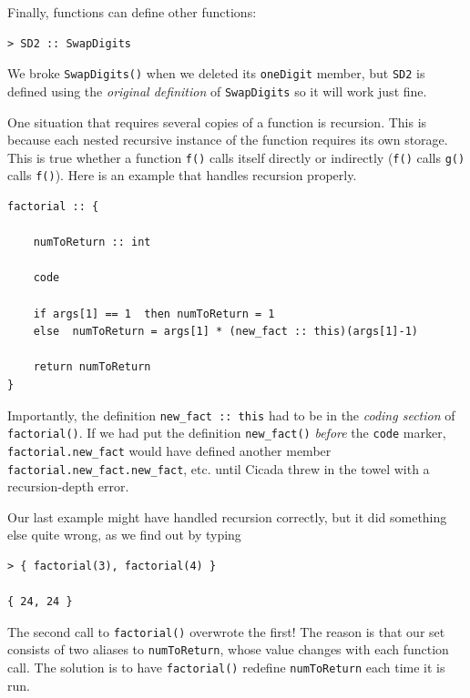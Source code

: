 \documentclass{article}
\newenvironment{code}{
       \begin{list}{}{
               \setlength{\leftmargin}{.4in}
               \setlength{\rightmargin}{0in}
               \setlength{\topsep}{.2in}
       }
       \small
       \item[] }
       { \end{list}   }
\begin{document}
Finally, functions can define other functions:

\begin{code} \begin{verbatim}
> SD2 :: SwapDigits
\end{verbatim} \end{code}

\noindent We broke \verb#SwapDigits()# when we deleted its \verb#oneDigit# member, but \verb#SD2# is defined using the \emph{original definition} of \verb#SwapDigits# so it will work just fine.

One situation that requires several copies of a function is recursion.  This is because each nested recursive instance of the function requires its own storage.  This is true whether a function \verb#f()# calls itself directly or indirectly (\verb#f()# calls \verb#g()# calls \verb#f()#).  Here is an example that handles recursion properly.

\begin{code} \begin{verbatim}
factorial :: {
    
    numToReturn :: int
    
    code
    
    if args[1] == 1  then numToReturn = 1
    else  numToReturn = args[1] * (new_fact :: this)(args[1]-1)
    
    return numToReturn
}
\end{verbatim} \end{code}

\noindent Importantly, the definition \verb#new_fact :: this# had to be in the \emph{coding section} of \verb#factorial()#.  If we had put the definition \verb#new_fact()# \emph{before} the \verb#code# marker, \verb#factorial.new_fact# would have defined another member \verb#factorial.new_fact.new_fact#, etc. until Cicada threw in the towel with a recursion-depth error.

Our last example might have handled recursion correctly, but it did something else quite wrong, as we find out by typing

\begin{code} \begin{verbatim}
> { factorial(3), factorial(4) }

{ 24, 24 }
\end{verbatim} \end{code}

\noindent The second call to \verb#factorial()# overwrote the first!  The reason is that our set consists of two aliases to \verb#numToReturn#, whose value changes with each function call.  The solution is to have \verb#factorial()# redefine \verb#numToReturn# each time it is run.
\end{document}

